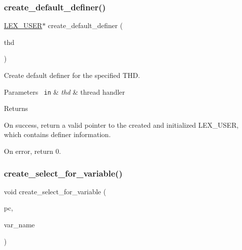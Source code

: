 \subsubsection{\texorpdfstring{create\+\_\+default\+\_\+definer()}{create\_default\_definer()}}
{\footnotesize\ttfamily \mbox{\hyperlink{structst__lex__user}{L\+E\+X\+\_\+\+U\+S\+ER}}$\ast$ create\+\_\+default\+\_\+definer (\begin{DoxyParamCaption}\item[{T\+HD $\ast$}]{thd }\end{DoxyParamCaption})}

Create default definer for the specified T\+HD.


\begin{DoxyParams}[1]{Parameters}
\mbox{\texttt{ in}}  & {\em thd} & thread handler\\
\hline
\end{DoxyParams}
\begin{DoxyReturn}{Returns}

\begin{DoxyItemize}
\item On success, return a valid pointer to the created and initialized L\+E\+X\+\_\+\+U\+S\+ER, which contains definer information.
\item On error, return 0. 
\end{DoxyItemize}
\end{DoxyReturn}
\mbox{\label{group__Runtime__Environment_gae69775e9e669f55cbedb293c4498717b}} 
\subsubsection{\texorpdfstring{create\+\_\+select\+\_\+for\+\_\+variable()}{create\_select\_for\_variable()}}
{\footnotesize\ttfamily void create\+\_\+select\+\_\+for\+\_\+variable (\begin{DoxyParamCaption}\item[{\mbox{\hyperlink{structParse__context}{Parse\+\_\+context}} $\ast$}]{pc,  }\item[{const char $\ast$}]{var\+\_\+name }\end{DoxyParamCaption})}

